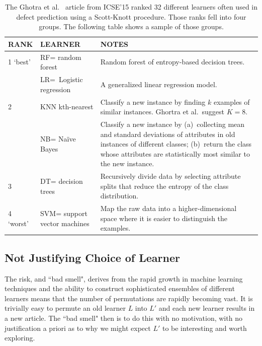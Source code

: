 \documentclass[preprint,10pt]{elsarticle}
\begin{document}
\begin{table}[!b]
 \caption{The Ghotra et al.~\cite{ghotra2015} article from ICSE'15 ranked 32 different learners often used in defect prediction using a Scott-Knott procedure. Those ranks fell into four groups. The following table shows a sample of those groups.}
  \label{tbl:learners}
 \footnotesize
 \vspace{5mm}
 \begin{tabular}{l|p{1.3in}|p{2.5in}}
{\bf RANK} & {\bf LEARNER} & {\bf NOTES}\\\hline
 1 `best' & RF= \newline random forest & 
 Random forest of entropy-based decision trees.\\\cline{2-3}
 &  LR=\  Logistic regression &
 A generalized linear regression
model.\\\hline
 2 & KNN  kth-nearest &  Classify a new instance by finding $k$ examples of similar instances.
 Ghortra et al.\ suggest $K=8$.\\\cline{2-3}
 & NB=  Na{\"i}ve Bayes &  Classify a new instance by (a)~collecting mean and standard deviations of attributes in old instances of  different classes; (b)~return the class whose attributes are statistically most similar to the new instance.\\\hline
 3 & DT=   decision trees & Recursively
 divide data by selecting attribute splits
 that reduce the entropy of the class distribution.\\
 \hline
 4 `worst' & SVM= \newline support vector machines &
 Map the raw data into a higher-dimensional space where it is easier to distinguish the examples.
 \\\hline
 \end{tabular}
 \vspace{-0.2cm}
 \end{table}

 
\subsection{Not Justifying Choice of Learner} \label{ref:learner}

The risk, and ``bad smell", derives from the rapid growth in machine learning techniques and the ability to construct sophisticated ensembles of different learners means that the number of permutations are rapidly becoming vast.  It is trivially easy to permute an old learner $L$ into $L'$ and each new learner results in a new article.  The ``bad smell" then is to do this with no motivation, with no justification a priori as to why we might expect $L'$ to be interesting and worth exploring.
\end{document}
